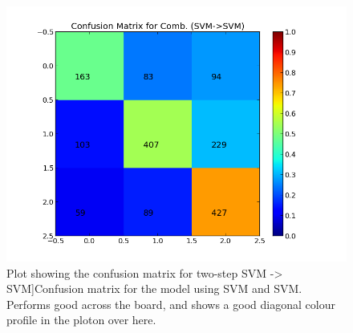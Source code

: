 \begin{minipage}[s]{\linewidth}
\begin{minipage}{0.45\linewidth}
\begin{figure}[H]
                \includegraphics[width=\linewidth]{../img/plots/grid/confusion_matrix_Comb-SVM-SVM.png}
         Plot showing the confusion matrix for two-step SVM -> SVM]{Confusion matrix for the model using SVM and SVM. Performs good across the board, and shows a good diagonal colour profile in the ploton over here.}
            \label{fig:confmat_svm_svm}
           \end{figure}
      \end{minipage} \\
 \end{minipage}
 
